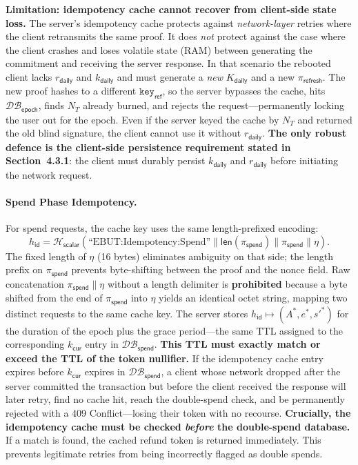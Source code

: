 \documentclass[11pt]{article}
\theoremstyle{definitionstyle}
\theoremstyle{plain}
\newcommand{\DB}{\mathcal{DB}}
\begin{document}
\textbf{Limitation: idempotency cache cannot recover from client-side state loss.}
The server's idempotency cache protects against \emph{network-layer} retries where the client retransmits the same proof. It does \emph{not} protect against the case where the client crashes and loses volatile state (RAM) between generating the commitment and receiving the server response. In that scenario the rebooted client lacks $r_{\mathsf{daily}}$ and $k_{\mathsf{daily}}$ and must generate a \emph{new} $K_{\mathsf{daily}}$ and a new $\pi_{\mathsf{refresh}}$. The new proof hashes to a different $\mathtt{key}_{\mathsf{ref}}$, so the server bypasses the cache, hits $\DB_{\mathsf{epoch}}$, finds $N_T$ already burned, and rejects the request---permanently locking the user out for the epoch. Even if the server keyed the cache by $N_T$ and returned the old blind signature, the client cannot use it without $r_{\mathsf{daily}}$. \textbf{The only robust defence is the client-side persistence requirement stated in Section~4.3.1}: the client must durably persist $k_{\mathsf{daily}}$ and $r_{\mathsf{daily}}$ before initiating the network request.

\paragraph{Spend Phase Idempotency.}
For spend requests, the cache key uses the same length-prefixed encoding:
\[
h_{\mathsf{id}} = \mathcal{H}_{\mathsf{scalar}}\!\left(\text{``EBUT:Idempotency:Spend''} \parallel \mathsf{len}(\pi_{\mathsf{spend}}) \parallel \pi_{\mathsf{spend}} \parallel \eta \right).
\]
The fixed length of $\eta$ (16 bytes) eliminates ambiguity on that side; the length prefix on $\pi_{\mathsf{spend}}$ prevents byte-shifting between the proof and the nonce field. Raw concatenation $\pi_{\mathsf{spend}} \parallel \eta$ without a length delimiter is \textbf{prohibited} because a byte shifted from the end of $\pi_{\mathsf{spend}}$ into $\eta$ yields an identical octet string, mapping two distinct requests to the same cache key. The server stores $h_{\mathsf{id}} \mapsto (A^*, e^*, s'^*)$ for the duration of the epoch plus the grace period---the same TTL assigned to the corresponding $k_{\mathsf{cur}}$ entry in $\DB_{\mathsf{spend}}$. \textbf{This TTL must exactly match or exceed the TTL of the token nullifier.} If the idempotency cache entry expires before $k_{\mathsf{cur}}$ expires in $\DB_{\mathsf{spend}}$, a client whose network dropped after the server committed the transaction but before the client received the response will later retry, find no cache hit, reach the double-spend check, and be permanently rejected with a 409 Conflict---losing their token with no recourse. \textbf{Crucially, the idempotency cache must be checked \emph{before} the double-spend database.} If a match is found, the cached refund token is returned immediately. This prevents legitimate retries from being incorrectly flagged as double spends.
\end{document}
